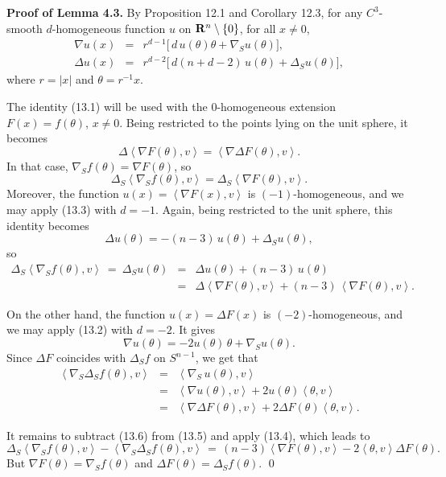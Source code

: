 \documentclass[reqno,12pt]{amsart}
\theoremstyle{plain}
\begin{document}
\vskip5mm
{\bf Proof of Lemma 4.3.} By Proposition 12.1 and Corollary 12.3, 
for any $C^3$-smooth $d$-homogeneous function $u$ on ${{\bf R}}^n \setminus \{0\}$, 
for all $x \neq 0$,
\begin{eqnarray}
\nabla u(x) 
 & = &
r^{d-1} \big[\,d \, u(\theta)\theta + \nabla_S u(\theta)\big], \\ 
\Delta u(x) 
 & = &
r^{d-2} \big[\,d(n+d-2)\, u(\theta) + \Delta_S u(\theta)\big],
\end{eqnarray}
where $r = |x|$ and $\theta = r^{-1} x$.

The identity (13.1) will be used with the $0$-homogeneous extension 
$F(x) = f(\theta)$, $x \neq 0$. Being restricted to the points lying 
on the unit sphere, it becomes
\begin{equation}
\Delta \left<\nabla F(\theta),v\right> = 
\left<\nabla \Delta F(\theta),v\right>.
\end{equation}
In that case, $\nabla_S f(\theta) = \nabla F(\theta)$, so
$$
\Delta_S \left<\nabla_S f(\theta),v\right> =
\Delta_S \left<\nabla F(\theta),v\right>.
$$
Moreover, the function $u(x) = \left<\nabla F(x),v\right>$ is 
$(-1)$-homogeneous, and we may apply (13.3) with $d=-1$. Again,
being restricted to the unit sphere, this identity becomes
$$
\Delta u(\theta) = -(n-3)\, u(\theta) + \Delta_S u(\theta),
$$
so
\begin{eqnarray}
\Delta_S \left<\nabla_S f(\theta),v\right>
 \ = \ \Delta_S u(\theta)
 & = & \Delta u(\theta) + (n-3)\, u(\theta) \nonumber \\
 & = &
\Delta \left<\nabla F(\theta),v\right> +  (n-3)\,\left<\nabla F(\theta),v\right>.
\end{eqnarray}

On the other hand, the function $u(x) = \Delta F(x)$ is 
$(-2)$-homogeneous, and we may apply (13.2) with $d=-2$. It gives
$$
\nabla u(\theta) = -2 u(\theta)\,\theta + \nabla_S u(\theta).
$$
Since $\Delta F$ coincides with $\Delta_S f$ on $S^{n-1}$, we get that
\begin{eqnarray}
\left<\nabla_S \Delta_S f(\theta),v\right>
 & = & 
\left<\nabla_S\, u(\theta),v\right>  \nonumber \\
 & = & 
\left<\nabla u(\theta),v\right> + 2 u(\theta)\left<\theta,v\right> \nonumber \\
 & = &
\left<\nabla \Delta F(\theta),v\right> + 2 \Delta F(\theta)\left<\theta,v\right>.
\end{eqnarray}

It remains to subtract (13.6) from (13.5) and apply (13.4), which 
leads to
$$
\Delta_S \left<\nabla_S f(\theta),v\right> - 
\left<\nabla_S \Delta_S f(\theta),v\right> \, = \, 
(n-3)\left<\nabla F(\theta),v\right> - 2\left<\theta,v\right>\Delta F(\theta).
$$
But $\nabla F(\theta) = \nabla_S f(\theta)$ and
$\Delta F(\theta) = \Delta_S f(\theta)$.
\qed
\end{document}
